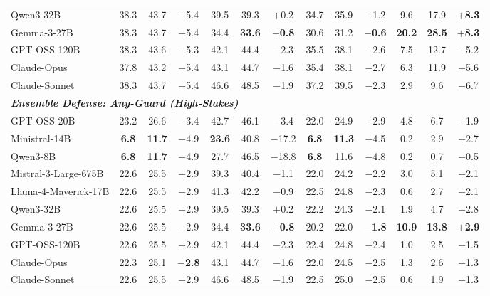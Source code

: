 \begin{table}[t]
{\begin{tabular}{l ccc ccc ccc ccc}
Qwen3-32B              & 38.3 & 43.7 & $-$5.4 & 39.5 & 39.3 & $+$0.2 & 34.7 & 35.9 & $-$1.2 & 9.6 & 17.9 & \textbf{$+$8.3} \\
Gemma-3-27B            & 38.3 & 43.7 & $-$5.4 & 34.4 & \textbf{33.6} & \textbf{$+$0.8} & 30.6 & 31.2 & \textbf{$-$0.6} & \textbf{20.2} & \textbf{28.5} & \textbf{$+$8.3} \\
GPT-OSS-120B           & 38.3 & 43.6 & $-$5.3 & 42.1 & 44.4 & $-$2.3 & 35.5 & 38.1 & $-$2.6 & 7.5 & 12.7 & $+$5.2 \\
Claude-Opus            & 37.8 & 43.2 & $-$5.4 & 43.1 & 44.7 & $-$1.6 & 35.4 & 38.1 & $-$2.7 & 6.3 & 11.9 & $+$5.6 \\
Claude-Sonnet          & 38.3 & 43.7 & $-$5.4 & 46.6 & 48.5 & $-$1.9 & 37.2 & 39.5 & $-$2.3 & 2.9 & 9.6 & $+$6.7 \\
\midrule
\multicolumn{13}{l}{\textbf{\textit{Ensemble Defense: Any-Guard (High-Stakes)}}} \\
GPT-OSS-20B            & 23.2 & 26.6 & $-$3.4 & 42.7 & 46.1 & $-$3.4 & 22.0 & 24.9 & $-$2.9 & 4.8 & 6.7 & $+$1.9 \\
Ministral-14B          & \textbf{6.8} & \textbf{11.7} & $-$4.9 & \textbf{23.6} & 40.8 & $-$17.2 & \textbf{6.8} & \textbf{11.3} & $-$4.5 & 0.2 & 2.9 & $+$2.7 \\
Qwen3-8B               & \textbf{6.8} & \textbf{11.7} & $-$4.9 & 27.7 & 46.5 & $-$18.8 & \textbf{6.8} & 11.6 & $-$4.8 & 0.2 & 0.7 & $+$0.5 \\
Mistral-3-Large-675B   & 22.6 & 25.5 & $-$2.9 & 39.3 & 40.4 & $-$1.1 & 22.0 & 24.2 & $-$2.2 & 3.0 & 5.1 & $+$2.1 \\
Llama-4-Maverick-17B   & 22.6 & 25.5 & $-$2.9 & 41.3 & 42.2 & $-$0.9 & 22.5 & 24.8 & $-$2.3 & 0.6 & 2.7 & $+$2.1 \\
Qwen3-32B              & 22.6 & 25.5 & $-$2.9 & 39.5 & 39.3 & $+$0.2 & 22.2 & 24.3 & $-$2.1 & 1.9 & 4.7 & $+$2.8 \\
Gemma-3-27B            & 22.6 & 25.5 & $-$2.9 & 34.4 & \textbf{33.6} & \textbf{$+$0.8} & 20.2 & 22.0 & \textbf{$-$1.8} & \textbf{10.9} & \textbf{13.8} & \textbf{$+$2.9} \\
GPT-OSS-120B           & 22.6 & 25.5 & $-$2.9 & 42.1 & 44.4 & $-$2.3 & 22.4 & 24.8 & $-$2.4 & 1.0 & 2.5 & $+$1.5 \\
Claude-Opus            & 22.3 & 25.1 & \textbf{$-$2.8} & 43.1 & 44.7 & $-$1.6 & 22.0 & 24.5 & $-$2.5 & 1.3 & 2.6 & $+$1.3 \\
Claude-Sonnet          & 22.6 & 25.5 & $-$2.9 & 46.6 & 48.5 & $-$1.9 & 22.5 & 25.0 & $-$2.5 & 0.6 & 1.9 & $+$1.3 \\

\end{tabular}}
\end{table}
